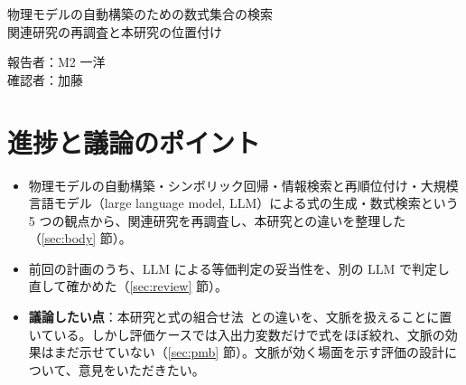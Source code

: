 \documentclass[a4j,dvipdfmx,10pt]{jresume}
\makeatletter
\newcommand{\rk}{\textrm{Recall@}K}
\makeatother
\begin{document}

\medskip
\begin{center}
  {\Large 物理モデルの自動構築のための数式集合の検索\\ 関連研究の再調査と本研究の位置付け}
\end{center}

\begin{flushright}
  報告者：M2\; 一洋 \\
  確認者：加藤 \\
\end{flushright}

\begin{abstract}
本研究の目的は、複数の情報源から収集した数式の中から、作りたいモデルに使える可能性の高い数式を提示する手法を開発することである。提示した数式からモデルを組み立てて確かめるのは利用者である。作成するモデルは、説明文とモデルの入出力変数で表される。提案手法は 2 段階の処理から構成される。第 1 段では、収集した多量の数式を、説明文と式周辺の文章（\textbf{文脈}）の近さと入出力変数の重複率で採点し、上位 $N_1$ 件に絞る。第 2 段では、10 個の特徴量を持つ多層パーセプトロン（multilayer perceptron, MLP）を用いて、第 1 段で選択した数式を並べ直す。モデルを構成する数式の数は事前にわからないため、上位から 1 式ずつ選び、選んだ式に出力変数がすべて現れ、入力変数以外の変数の数が式の数以下になった時点で選択を止める（20 式選んでも満たさなければ打ち切る）。提案手法を文献など 361 件の情報源から集めた 11{,}146 式と、評価用の 1{,}823 ケースで評価した結果、上位 $K$ 件に入った正解式の割合 $\rk$（$K$ は正解式の数）は、第 1 段と同じ採点で全数式を並べる古典的な情報検索手法の 0.521 から、\textbf{0.743} に上がった。並べ直しでは、主に変数の重複率に基づく特徴量が効き、文脈の近さはほとんど効かなかった。
\end{abstract}

\section{進捗と議論のポイント}
\begin{itemize}[leftmargin=1.5em]
  \item 物理モデルの自動構築・シンボリック回帰・情報検索と再順位付け・大規模言語モデル（large language model, LLM）による式の生成・数式検索という 5 つの観点から、関連研究を再調査し、本研究との違いを整理した（\ref{sec:body} 節）。
  \item 前回の計画のうち、LLM による等価判定の妥当性を、別の LLM で判定し直して確かめた（\ref{sec:review} 節）。
  \item \textbf{議論したい点}：本研究と式の組合せ法~\citep{CombineEq}との違いを、文脈を扱えることに置いている。しかし評価ケースでは入出力変数だけで式をほぼ絞れ、文脈の効果はまだ示せていない（\ref{sec:pmb} 節）。文脈が効く場面を示す評価の設計について、意見をいただきたい。
\end{itemize}
\end{document}
